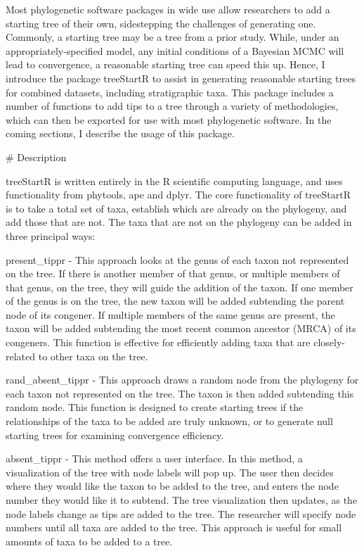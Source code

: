 Most phylogenetic software packages in wide use allow researchers to add a starting tree of their own, sidestepping the challenges of generating one. 
Commonly, a starting tree may be a tree from a prior study. 
While, under an appropriately-specified model, any initial conditions of a Bayesian MCMC will lead to convergence, a reasonable starting tree can speed this up.
Hence, I introduce the package treeStartR to assist in generating reasonable starting trees for combined datasets, including stratigraphic taxa.
This package includes a number of functions to add tips to a tree through a variety of methodologies, which can then be exported for use with most phylogenetic software.
In the coming sections, I describe the usage of this package.

# Description

treeStartR is written entirely in the R scientific computing language, and uses functionality from phytools, ape and dplyr.
The core functionality of treeStartR is to take a total set of taxa, establish which are already on the phylogeny, and add those that are not.
The taxa that are not on the phylogeny can be added in three principal ways: 

present_tippr - This approach looks at the genus of each taxon not represented on the tree. 
If there is another member of that genus, or multiple members of that genus, on the tree, they will guide the addition of the taxon.
If one member of the genus is on the tree, the new taxon will be added subtending the parent node of its congener. 
If multiple members of the same genus are present, the taxon will be added subtending the most recent common ancestor (MRCA) of its congeners.
This function is effective for efficiently adding taxa that are closely-related to other taxa on the tree.

rand_absent_tippr - This approach draws a random node from the phylogeny for each taxon not represented on the tree.
The taxon is then added subtending this random node.
This function is designed to create starting trees if the relationships of the taxa to be added are truly unknown, or to generate null starting trees for examining convergence efficiency.

absent_tippr - This method offers a user interface.
In this method, a visualization of the tree with node labels will pop up. 
The user then decides where they would like the taxon to be added to the tree, and enters the node number they would like it to subtend.
The tree visualization then updates, as the node labels change as tips are added to the tree. 
The researcher will specify node numbers until all taxa are added to the tree. 
This approach is useful for small amounts of taxa to be added to a tree.

